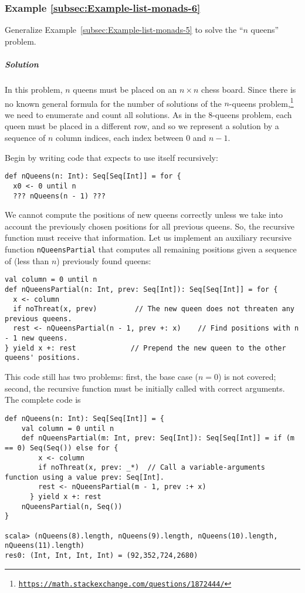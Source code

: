 \subsubsection{Example \label{subsec:Example-list-monads-6}\ref{subsec:Example-list-monads-6}}

Generalize Example~\ref{subsec:Example-list-monads-5} to solve the
``$n$ queens'' problem.

\subparagraph{Solution}

In this problem, $n$ queens must be placed on an $n\times n$ chess
board. Since there is no known general formula for the number of solutions
of the $n$-queens problem,\footnote{\texttt{\href{https://math.stackexchange.com/questions/1872444/}{https://math.stackexchange.com/questions/1872444/}}}
we need to enumerate and count all solutions. As in the $8$-queens
problem, each queen must be placed in a different row, and so we represent
a solution by a sequence of $n$ column indices, each index between
$0$ and $n-1$.

Begin by writing code that expects to use itself recursively:
\begin{lstlisting}
def nQueens(n: Int): Seq[Seq[Int]] = for {
  x0 <- 0 until n
  ??? nQueens(n - 1) ???
\end{lstlisting}
We cannot compute the positions of new queens correctly unless we
take into account the previously chosen positions for all previous
queens. So, the recursive function must receive that information.
Let us implement an auxiliary recursive function \lstinline!nQueensPartial!
that computes all remaining positions given a sequence of (less than
$n$) previously found queens:
\begin{lstlisting}
val column = 0 until n
def nQueensPartial(n: Int, prev: Seq[Int]): Seq[Seq[Int]] = for {
  x <- column
  if noThreat(x, prev)         // The new queen does not threaten any previous queens.
  rest <- nQueensPartial(n - 1, prev +: x)    // Find positions with n - 1 new queens.
} yield x +: rest             // Prepend the new queen to the other queens' positions.
\end{lstlisting}

This code still has two problems: first, the base case ($n=0$) is
not covered; second, the recursive function must be initially called
with correct arguments. The complete code is
\begin{lstlisting}
def nQueens(n: Int): Seq[Seq[Int]] = {
    val column = 0 until n
    def nQueensPartial(m: Int, prev: Seq[Int]): Seq[Seq[Int]] = if (m == 0) Seq(Seq()) else for {
        x <- column
        if noThreat(x, prev: _*)  // Call a variable-arguments function using a value prev: Seq[Int].
        rest <- nQueensPartial(m - 1, prev :+ x)
      } yield x +: rest
    nQueensPartial(n, Seq())
}

scala> (nQueens(8).length, nQueens(9).length, nQueens(10).length, nQueens(11).length)
res0: (Int, Int, Int, Int) = (92,352,724,2680)
\end{lstlisting}


